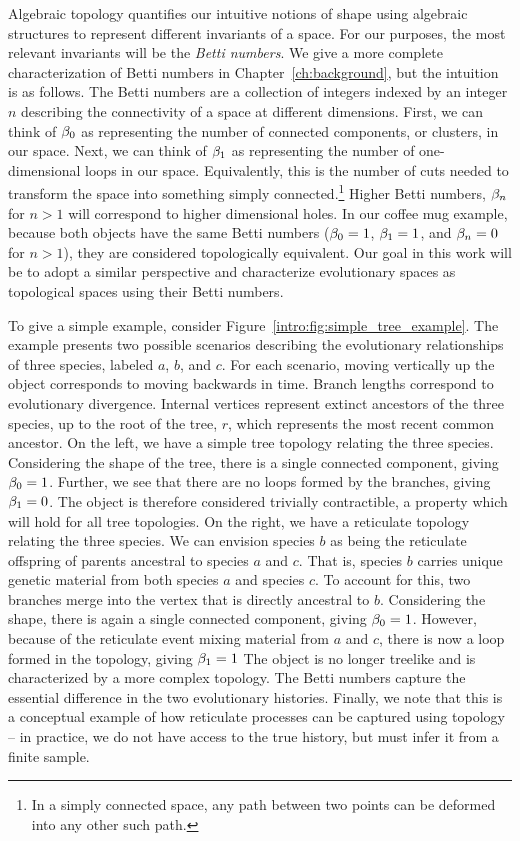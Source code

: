 Algebraic topology quantifies our intuitive notions of shape using algebraic structures to represent different invariants of a space.
For our purposes, the most relevant invariants will be the \emph{Betti numbers}.
We give a more complete characterization of Betti numbers in Chapter~\ref{ch:background}, but the intuition is as follows.
The Betti numbers are a collection of integers indexed by an integer $n$ describing the connectivity of a space at different dimensions.
First, we can think of $\beta_0$ as representing the number of connected components, or clusters, in our space.
Next, we can think of $\beta_1$ as representing the number of one-dimensional loops in our space.
Equivalently, this is the number of cuts needed to transform the space into something simply connected.\footnote{In a simply connected space, any path between two points can be deformed into any other such path.}
Higher Betti numbers, $\beta_n$ for $n>1$ will correspond to higher dimensional holes.
In our coffee mug example, because both objects have the same Betti numbers ($\beta_0=1$, $\beta_1=1$, and $\beta_n=0$ for $n>1$), they are considered topologically equivalent.
Our goal in this work will be to adopt a similar perspective and characterize evolutionary spaces as topological spaces using their Betti numbers.

To give a simple example, consider Figure~\ref{intro:fig:simple_tree_example}.
The example presents two possible scenarios describing the evolutionary relationships of three species, labeled $a$, $b$, and $c$.
For each scenario, moving vertically up the object corresponds to moving backwards in time.
Branch lengths correspond to evolutionary divergence.
Internal vertices represent extinct ancestors of the three species, up to the root of the tree, $r$, which represents the most recent common ancestor.
On the left, we have a simple tree topology relating the three species.
Considering the shape of the tree, there is a single connected component, giving $\beta_0=1$.
Further, we see that there are no loops formed by the branches, giving $\beta_1=0$.
The object is therefore considered trivially contractible, a property which will hold for all tree topologies.
On the right, we have a reticulate topology relating the three species.
We can envision species $b$ as being the reticulate offspring of parents ancestral to species $a$ and $c$.
That is, species $b$ carries unique genetic material from both species $a$ and species $c$.
To account for this, two branches merge into the vertex that is directly ancestral to $b$.
Considering the shape, there is again a single connected component, giving $\beta_0=1$.
However, because of the reticulate event mixing material from $a$ and $c$, there is now a loop formed in the topology, giving $\beta_1=1$
The object is no longer treelike and is characterized by a more complex topology.
The Betti numbers capture the essential difference in the two evolutionary histories.
Finally, we note that this is a conceptual example of how reticulate processes can be captured using topology -- in practice, we do not have access to the true history, but must infer it from a finite sample.

